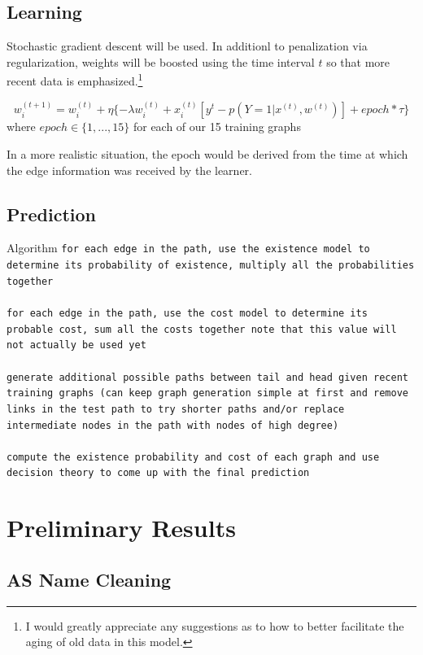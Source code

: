 \documentclass{article} %
\begin{document}
\subsection{Learning}

Stochastic gradient descent will be used.  In additionl to penalization via
regularization, weights will be boosted using the time interval $t$ so that more
recent data is emphasized.\footnote{I would greatly appreciate any
  suggestions as to how to better facilitate the aging of old data in this model.}

\begin{displaymath}
w_i^{(t+1)} = w_i^{(t)} + \eta \{- \lambda w_i^{(t)} + x_i^{(t)} [ y^t -  p(Y=1|x^{(t)},w^{(t)})] + epoch*\tau \}
\end{displaymath}
where $epoch \in \{ 1,...,15 \}$ for each of our 15 training graphs

In a more realistic situation, the epoch would be derived from the time at
which the edge information was received by the learner.

\subsection{Prediction}

Algorithm
\texttt{for each edge in the path, use the existence model to determine its probability of existence, multiply all the probabilities together \\
\\
for each edge in the path, use the cost model to determine its probable cost, sum all the costs together note that this value will not actually be used yet \\
\\
generate additional possible paths between tail and head given recent training graphs (can keep graph generation simple at first and remove links in the test path to try shorter paths and/or replace intermediate nodes in the path with nodes of high degree) \\
\\
compute the existence probability and cost of each graph and use decision theory to come up with the final prediction
}

\section{Preliminary Results}

\subsection{AS Name Cleaning}
\end{document}
